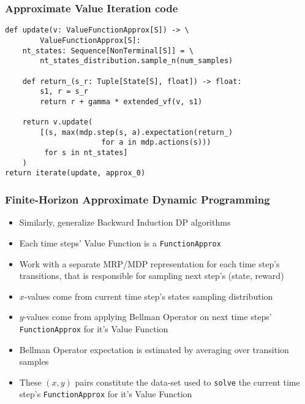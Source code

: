 \documentclass[handout]{beamer}
\begin{document}
\begin{frame}[fragile]
\frametitle{Approximate Value Iteration code}
\pause
\begin{lstlisting}
def update(v: ValueFunctionApprox[S]) -> \
        ValueFunctionApprox[S]:
    nt_states: Sequence[NonTerminal[S]] = \
        nt_states_distribution.sample_n(num_samples)

    def return_(s_r: Tuple[State[S], float]) -> float:
        s1, r = s_r
        return r + gamma * extended_vf(v, s1)

    return v.update(
        [(s, max(mdp.step(s, a).expectation(return_)
                      for a in mdp.actions(s)))
         for s in nt_states]
    )
return iterate(update, approx_0)
\end{lstlisting}
\end{frame}



\begin{frame}
\frametitle{Finite-Horizon Approximate Dynamic Programming}
\pause
\begin{itemize}[<+->]
\item Similarly, generalize Backward Induction DP algorithms
\item Each time steps' Value Function is a \lstinline{FunctionApprox}
\item Work with a separate MRP/MDP representation for each time step's transitions, that is responsible for sampling next step's (state, reward)
\item $x$-values come from current time step's states sampling distribution
\item $y$-values come from applying Bellman Operator on next time steps' \lstinline{FunctionApprox} for it's Value Function
\item  Bellman Operator expectation is estimated by averaging over transition samples
\item These $(x,y)$ pairs constitute the data-set used to \lstinline{solve} the current time step's \lstinline{FunctionApprox} for it's Value Function
\end{itemize}
\end{frame}
\end{document}
